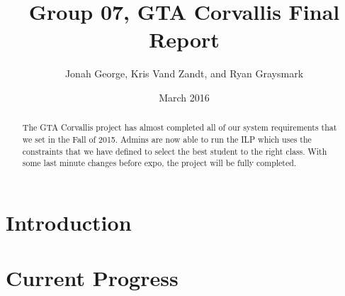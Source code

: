\documentclass[10pt,draftclsnofoot,onecolumn]{IEEEtran}
\title{Group 07, GTA Corvallis Final Report}
\author{Jonah George, Kris Vand Zandt, and Ryan Graysmark}
\date{March 2016}
\begin{document}
\maketitle

\hfill \break \hfill \break \hfill \break
\hfill \break \hfill \break \hfill \break
\hfill \break \hfill \break \hfill \break
\hfill \break \hfill \break \hfill \break

\begin{abstract}
The GTA Corvallis project has almost completed all of our system requirements that we set in the Fall of 2015.
Admins are now able to run the ILP which uses the constraints that we have defined to select the best student to the right class.
With some last minute changes before expo, the project will be fully completed.
\end{abstract}

\newpage
{}%

\section{Introduction}




\section{Current Progress}







\end{document}
